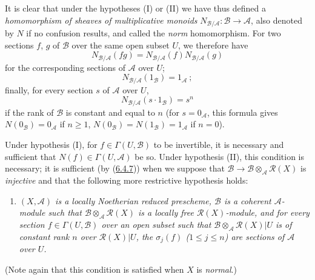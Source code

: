 \begin{env}[6.5.1]
It is clear that under the hypotheses (I) or (II) we have thus defined a
\emph{homomorphism of sheaves of multiplicative monoids}
$N_{\mathcal{B}/\mathcal{A}}:\mathcal{B}\to\mathcal{A}$, also denoted by $N$
if no confusion results, and called the \emph{norm} homomorphism. For two
sections $f$, $g$ of $\mathcal{B}$ over the same open subset $U$, we
therefore have
\[
\label{II.6.5.1.1}
N_{\mathcal{B}/\mathcal{A}}(fg)
=N_{\mathcal{B}/\mathcal{A}}(f)N_{\mathcal{B}/\mathcal{A}}(g)
\tag{6.5.1.1}
\]
for the corresponding sections of $\mathcal{A}$ over $U$;
\[
\label{II.6.5.1.2}
N_{\mathcal{B}/\mathcal{A}}(1_{\mathcal{B}})=1_{\mathcal{A}}~;
\tag{6.5.1.2}
\]
finally, for every section $s$ of $\mathcal{A}$ over $U$,
\[
\label{II.6.5.1.3}
N_{\mathcal{B}/\mathcal{A}}(s\cdot1_{\mathcal{B}})=s^n
\tag{6.5.1.3}
\]
if the rank of $\mathcal{B}$ is constant and equal to $n$ (for
$s=0_{\mathcal{A}}$, this formula gives
$N(0_{\mathcal{B}})=0_{\mathcal{A}}$ if $n\geq1$,
$N(0_{\mathcal{B}})=N(1_{\mathcal{B}})=1_{\mathcal{A}}$ if $n=0$).

Under hypothesis (I), for $f\in\Gamma(U,\mathcal{B})$ to be invertible, it
is necessary and sufficient that $N(f)\in\Gamma(U,\mathcal{A})$ be so. Under
hypothesis (II), this condition is necessary; it is sufficient (by
(\hyperref[II.6.4.7]{6.4.7})) when we suppose that
$\mathcal{B}\to\mathcal{B}\otimes_{\mathcal{A}}\mathcal{R}(X)$ is
\emph{injective} and that the following more restrictive hypothesis holds:
\begin{enumerate}
\item[(II \emph{bis})] \emph{$(X,\mathcal{A})$ is a locally Noetherian
reduced prescheme, $\mathcal{B}$ is a coherent $\mathcal{A}$-module such that
$\mathcal{B}\otimes_{\mathcal{A}}\mathcal{R}(X)$ is a locally free
$\mathcal{R}(X)$-module, and for every section
$f\in\Gamma(U,\mathcal{B})$ over an open subset such that
$\mathcal{B}\otimes_{\mathcal{A}}\mathcal{R}(X)|U$ is of constant rank $n$
over $\mathcal{R}(X)|U$, the $\sigma_j(f)$ ($1\leq j\leq n$) are sections of
$\mathcal{A}$ over $U$.}
\end{enumerate}
(Note again that this condition is satisfied when $X$ is
\emph{normal}.)
\end{env}

